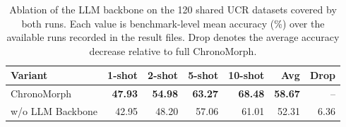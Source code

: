 \begin{table}[t]
\centering
\caption{Ablation of the LLM backbone on the 120 shared UCR datasets covered by both runs. Each value is benchmark-level mean accuracy (\%) over the available runs recorded in the result files. Drop denotes the average accuracy decrease relative to full ChronoMorph.}
\label{tab:ablation-llm-backbone}
\begin{tabular}{lrrrrrr}
\toprule
Variant & 1-shot & 2-shot & 5-shot & 10-shot & Avg & Drop \\
\midrule
ChronoMorph & \textbf{47.93} & \textbf{54.98} & \textbf{63.27} & \textbf{68.48} & \textbf{58.67} & -- \\
w/o LLM Backbone & 42.95 & 48.20 & 57.06 & 61.01 & 52.31 & 6.36 \\
\bottomrule
\end{tabular}
\end{table}
